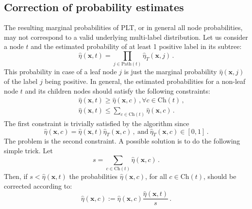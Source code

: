 \documentclass{article}
\newcommand{\Algo}[1]{\textsc{#1}}
\renewcommand{\vec}[1]{\boldsymbol{#1}}
\newcommand{\bx}{\vec{x}}
\newcommand{\heta}{\hat{\eta}}
\newcommand{\pa}[1]{\mathrm{pa}(#1)}
\newcommand{\Path}[1]{\mathrm{Path}(#1)}
\newcommand{\Children}[1]{\mathrm{Ch}(#1)}
\newcommand{\sectionBefore}{-0pt}
\newcommand{\sectionAfter}{-0pt}
\begin{document}
\vspace{\sectionBefore}
\subsection{Correction of probability estimates}
\label{sec:correction}
\vspace{\sectionAfter}

The resulting marginal probabilities of \Algo{PLT}, or in general all node probabilities, may not correspond to a valid underlying multi-label distribution. Let us consider a node $t$ and the estimated probability of at least 1 positive label in its subtree: 
$$
\heta(\bx, t) = \prod_{j \in \Path{t}} \heta_T(\bx, j) \,.
$$
This probability in case of a leaf node $j$ is just the marginal probability $\heta(\bx, j)$ of the label $j$ being positive.
In general, the estimated probabilities for a non-leaf node $t$ and its children nodes should satisfy the following constraints: 
\begin{eqnarray*}
&& \heta(\bx, t)  \ge \heta(\bx, c)\,, \forall c \in \Children{t}\,, \\
&& \heta(\bx, t)  \le \sum_{c \in \Children{t}}  \heta(\bx, c) \,. 
\end{eqnarray*}
The first constraint is trivially satisfied by the algorithm since 
$$
\heta(\bx, c) = \heta(\bx, t) \heta_T(\bx, c)\,,\mathrm{~and~}  \heta_T(\bx, c) \in [0,1]\,.
$$ 
The problem is the second constraint. A possible solution is to do the following simple trick. Let 
$$
s = \sum_{c \in \Children{t}} \heta(\bx, c) \,.
$$
Then, if $s < \heta(\bx, t)$ the probabilities $\heta(\bx, c)$, for all $c \in \Children{t}$, should be corrected according to:
$$
\heta(\bx, c) := \heta(\bx, c) \frac{\heta(\bx, t)}{s}\,.
$$

\end{document}
